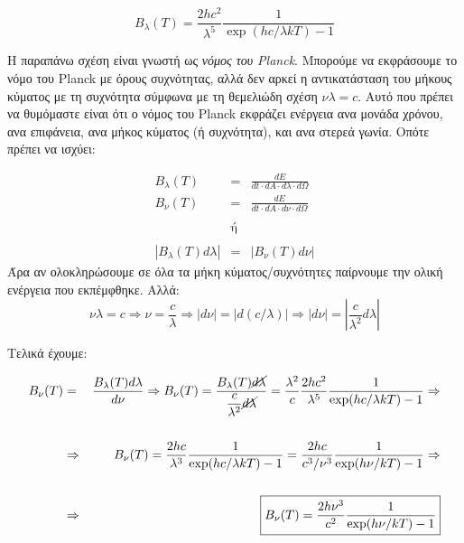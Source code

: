 \begin{equation}
    \label{eq:planck_function_lambda}
    B_{\lambda}(T) = \frac{2hc^2}{\lambda^5} \frac{1}{\exp(hc/\lambda kT) - 1}
\end{equation}

Η παραπάνω σχέση είναι γνωστή ως \textit{νόμος του Planck}. Μπορούμε να εκφράσουμε το νόμο του Planck με όρους συχνότητας, αλλά δεν αρκεί η αντικατάσταση του μήκους κύματος με τη συχνότητα σύμφωνα με τη θεμελιώδη σχέση $\nu \lambda = c$. Αυτό που πρέπει να θυμόμαστε είναι ότι {\color{blue} ο νόμος του Planck εκφράζει ενέργεια ανα μονάδα χρόνου, ανα επιφάνεια, ανα μήκος κύματος (ή συχνότητα), και ανα στερεά γωνία}. Οπότε πρέπει να ισχύει:

\begin{eqnarray*}
    B_{\lambda} (T) &=& \frac{dE}{dt \cdot dA \cdot d \lambda \cdot d \Omega} \\ 
    B_{\nu} (T) &=& \frac{dE}{dt \cdot dA \cdot d \nu \cdot d \Omega} \\\\
    &\text{ή}& \\\\
    |B_{\lambda} (T) d \lambda | &=& |B_{\nu} (T) d \nu |
\end{eqnarray*}
Άρα αν ολοκληρώσουμε σε όλα τα μήκη κύματος/συχνότητες παίρνουμε την ολική ενέργεια που εκπέμφθηκε. Αλλά: $$\nu \lambda = c \Rightarrow \nu = \frac{c}{\lambda} \Rightarrow |d\nu | = | d \left( c / \lambda \right) | \Rightarrow | d\nu | = \left | \frac{c}{\lambda^2}d\lambda \right |$$

Τελικά έχουμε:

\begin{eqnarray}
\label{eq:planck_function_frequency}
    B_{\nu}(T) &=& \frac{B_{\lambda}(T) d \lambda}{d\nu} \Rightarrow B_{\nu}(T) = \frac{B_{\lambda}(T) \cancel{d\lambda}}{\displaystyle  \frac{c}{\lambda^2} \cancel{d \lambda}} =  \frac{\lambda^2}{c} \frac{2hc^2}{\lambda^5} \frac{1}{\exp(hc / \lambda kT) - 1} \Rightarrow \nonumber \\ \nonumber \\
    &\Rightarrow & B_{\nu}(T) =  \frac{2hc}{\lambda^3} \frac{1}{\exp(hc / \lambda kT) - 1} =  \frac{2hc}{c^3 / \nu^3} \frac{1}{\exp(h \nu / kT) - 1} \Rightarrow \nonumber \\ \nonumber \\
    &\Rightarrow & \boxed{B_{\nu}(T) =  \frac{2h \nu^3}{c^2} \frac{1}{\exp(h \nu / kT) - 1}}
\end{eqnarray}


